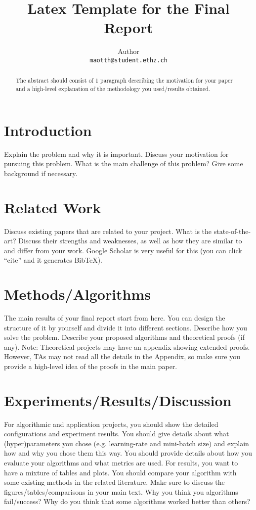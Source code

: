 \documentclass{article}
\title{Latex Template for the Final Report}
\author{
    Author \\
    \texttt{maotth@student.ethz.ch} \\
}
\begin{document}
\maketitle

\begin{abstract}
    The abstract should consist of 1 paragraph describing the motivation for your paper and a high-level explanation of the methodology you used/results obtained.
\end{abstract}


\section{Introduction}
Explain the problem and why it is important. Discuss your motivation for pursuing this problem. What is the main challenge of this problem? Give some background if necessary.


\section{Related Work}
Discuss existing papers that are related to your project. What is the state-of-the-art? Discuss their strengths and weaknesses, as well as how they are similar to and differ from your work. Google Scholar is very useful for this (you can click ``cite'' and it generates BibTeX).


\section{Methods/Algorithms}
The main results of your final report start from here. You can design the structure of it by yourself and divide it into different sections. Describe how you solve the problem. Describe your proposed algorithms and theoretical proofs (if any). Note: Theoretical projects may have an appendix showing extended proofs. However, TAs may not read all the details in the Appendix, so make sure you provide a high-level idea of the proofs in the main paper.


\section{Experiments/Results/Discussion}
For algorithmic and application projects, you should show the detailed configurations and experiment results. You should give details about what (hyper)parameters you chose (e.g. learning-rate and mini-batch size) and explain how and why you chose them this way. You should provide details about how you evaluate your algorithms and what metrics are used. For results, you want to have a mixture of tables and plots. You should compare your algorithm with some existing methods in the related literature. Make sure to discuss the figures/tables/comparisons in your main text. Why you think you algorithms fail/success? Why do you think that some algorithms worked better than others?
\end{document}
